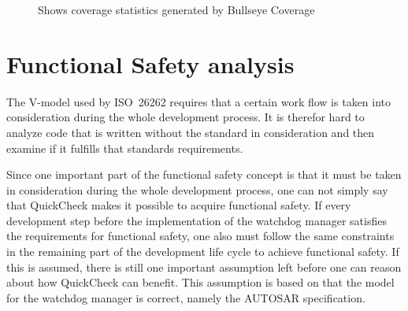\begin{figure}[!ht]
  \setlength\fboxsep{0pt}
  \setlength\fboxrule{0.5pt}
  \caption{Shows coverage statistics generated by Bullseye Coverage}
  \label{FIG:BULLSEYE}
\end{figure}


\section{Functional Safety analysis}
The V-model used by ISO~26262 requires that a certain work flow is
taken into consideration during the whole development process. It is
therefor hard to analyze code that is written without the standard in
consideration and then examine if it fulfills that standards
requirements.

Since one important part of the functional safety concept is that it
must be taken in consideration during the whole development process,
one can not simply say that QuickCheck makes it possible to acquire
functional safety. If every development step before the implementation
of the watchdog manager satisfies the requirements for functional
safety, one also must follow the same constraints in the remaining
part of the development life cycle to achieve functional safety. If
this is assumed, there is still one important assumption left before
one can reason about how QuickCheck can benefit. This assumption is
based on that the model for the watchdog manager is correct, namely
the AUTOSAR specification.

